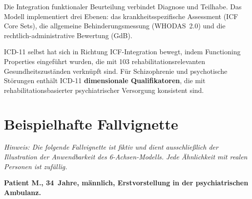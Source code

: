 \documentclass[11pt,a4paper]{article}
\begin{document}
Die Integration funktionaler Beurteilung verbindet Diagnose und Teilhabe. Das Modell implementiert drei Ebenen: das krankheitsspezifische Assessment (ICF Core Sets), die allgemeine Behinderungsmessung (WHODAS~2.0) und die rechtlich-administrative Bewertung (GdB).

ICD-11 selbst hat sich in Richtung ICF-Integration bewegt, indem \glqq Functioning Properties\grqq{} eingef\"uhrt wurden, die mit 103 rehabilitationsrelevanten Gesundheitszust\"anden verkn\"upft sind. F\"ur Schizophrenie und psychotische St\"orungen enth\"alt ICD-11 \textbf{dimensionale Qualifikatoren}, die mit rehabilitationsbasierter psychiatrischer Versorgung konsistent sind.


\section{Beispielhafte Fallvignette}
\label{sec:fallvignette}

\textit{Hinweis: Die folgende Fallvignette ist fiktiv und dient ausschlie\ss{}lich der Illustration der Anwendbarkeit des 6-Achsen-Modells. Jede \"Ahnlichkeit mit realen Personen ist zuf\"allig.}

\vspace{0.5em}
\noindent \textbf{Patient M., 34~Jahre, m\"annlich, Erstvorstellung in der psychiatrischen Ambulanz.}
\end{document}
